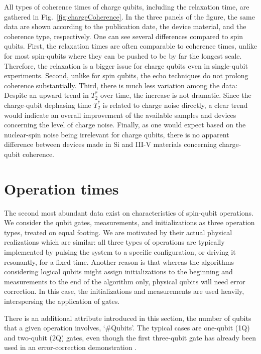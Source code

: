 \documentclass[aps, prx, showpacs, twocolumn, superscriptaddress, notitlepage, longbibliography, floatfix, nofootinbib]{revtex4-2}
\newcommand{\myKey}[1]{$\whitearrowupfrombar$\textit{#1}}
\renewcommand{\myKey}[1]{\textit{#1}}
\renewcommand{\myKey}[1]{`{#1}'}
\newcommand{\recheck}[1]{{#1}}
\begin{document}
All types of coherence times of charge qubits, including the relaxation time, are gathered in Fig.~\ref{fig:chargeCoherence}. In the three panels of the figure, the same data are shown according to the publication date, the device material, and the coherence type, respectively. One can see several differences compared to spin qubits. \recheck{
First, the relaxation times are often comparable to coherence times, unlike for most spin-qubits where they can be pushed to be by far the longest scale.} 
Therefore, the relaxation is a bigger issue for charge qubits even in single-qubit experiments. \recheck{Second, unlike for spin qubits, the echo techniques do not prolong coherence substantially.} \recheck{Third, there is much less variation among the data:} 
\recheck{Despite an upward trend in $T_2^*$ over time, the increase is not dramatic. Since the charge-qubit dephasing time $T_2^*$ is related to charge noise directly, a clear trend would indicate} an overall improvement of the available samples and devices concerning the level of charge noise.
\recheck{Finally, as one would expect based on the nuclear-spin noise being irrelevant for charge qubits, there is no apparent difference between devices made in Si and III-V materials concerning charge-qubit coherence.}

\vspace{-0.3cm}
\section{Operation times}

\label{sec:operations}

The second most abundant data exist on characteristics of spin-qubit operations. We consider the qubit gates, measurements, and initializations as three operation types, treated on equal footing.
We are motivated by their actual physical realizations which are similar: all three types of operations are typically implemented by pulsing the system to a specific configuration, or driving it resonantly, for a fixed time. Another reason is that whereas the algorithms considering logical qubits might assign initializations to the beginning and measurements to the end of the algorithm only, physical qubits will need error correction. In this case, the initializations and measurements are used heavily, interspersing the application of gates.


There is an additional attribute introduced in this section, the number of qubits that a given operation involves, \myKey{\#Qubits}. \recheck{The typical cases are one-qubit (1Q) and two-qubit (2Q) gates, even though the first three-qubit gate has already been used in an error-correction demonstration \cite{takeda_quantum_2022}. 
}
\end{document}
